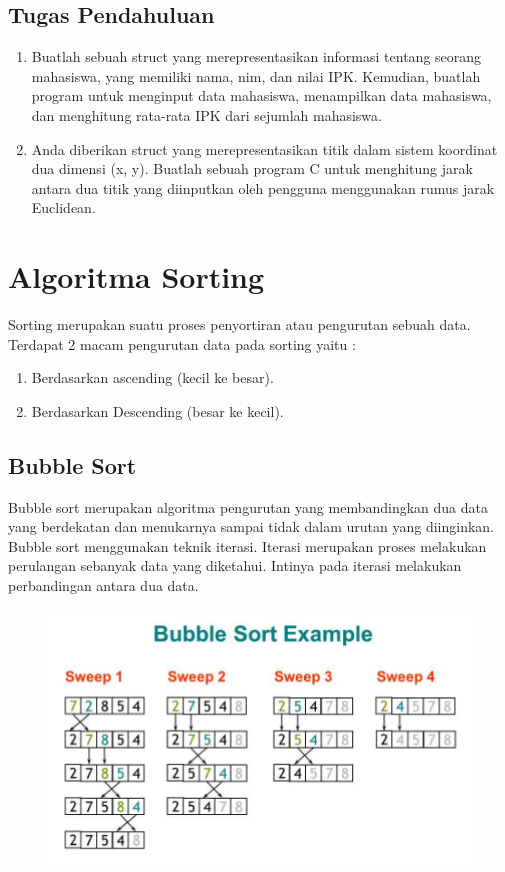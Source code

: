 \subsection{Tugas Pendahuluan}
\begin{enumerate}
    \item Buatlah sebuah struct yang merepresentasikan informasi tentang seorang mahasiswa, yang memiliki nama, nim, dan nilai IPK. Kemudian, buatlah program untuk menginput data mahasiswa, menampilkan data mahasiswa, dan menghitung rata-rata IPK dari sejumlah mahasiswa.
    \item Anda diberikan struct yang merepresentasikan titik dalam sistem koordinat dua dimensi (x, y). Buatlah sebuah program C untuk menghitung jarak antara dua titik yang diinputkan oleh pengguna menggunakan rumus jarak Euclidean.
\end{enumerate}

\section{Algoritma Sorting}
Sorting merupakan suatu proses penyortiran atau pengurutan sebuah data.\\
Terdapat 2 macam pengurutan data pada sorting yaitu :
\begin{enumerate}
    \item Berdasarkan ascending (kecil ke besar).
    \item Berdasarkan Descending (besar ke kecil).
\end{enumerate}

\subsection{Bubble Sort}
Bubble sort merupakan algoritma pengurutan yang membandingkan dua data yang berdekatan dan menukarnya sampai tidak dalam urutan yang diinginkan.
Bubble sort menggunakan teknik iterasi. Iterasi merupakan proses melakukan perulangan sebanyak data yang diketahui.
Intinya pada iterasi melakukan perbandingan antara dua data.

\begin{figure}[H]
    \centering
    \includegraphics[width=0.7\linewidth]{../P4/img/screenshot006.png}
    \caption{}
    \label{fig:enam}
\end{figure}

